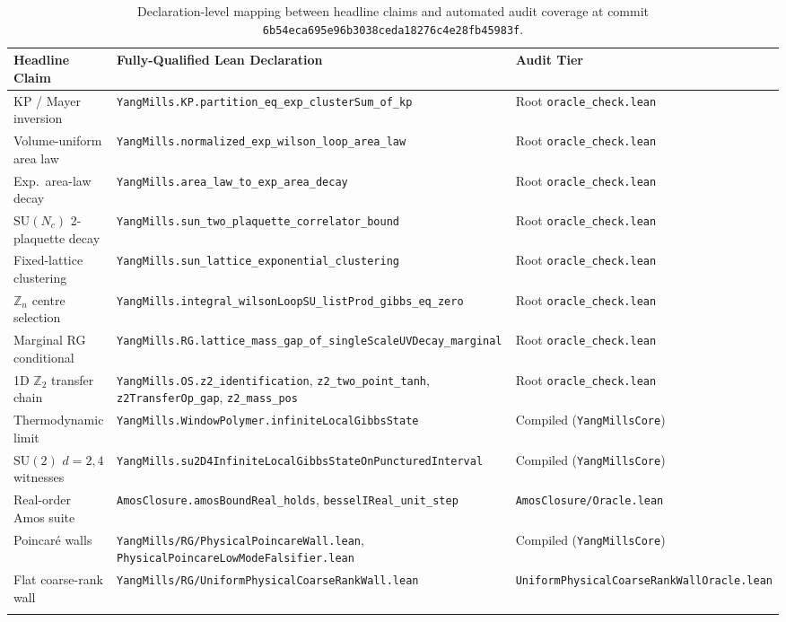 \documentclass[11pt]{article}
\newcommand{\Z}{\mathbb{Z}}
\begin{document}
{\footnotesize
\begin{longtable}{@{}>{\raggedright\arraybackslash}p{}>{\raggedright\arraybackslash}p{}>{\raggedright\arraybackslash}p{}@{}}
\toprule
\textbf{Headline Claim} & \textbf{Fully-Qualified Lean Declaration} & \textbf{Audit Tier} \\
\midrule
\endhead
KP / Mayer inversion & \nolinkurl{YangMills.KP.partition_eq_exp_clusterSum_of_kp} & Root \texttt{oracle\_check.lean} \\
Volume-uniform area law & \nolinkurl{YangMills.normalized_exp_wilson_loop_area_law} & Root \texttt{oracle\_check.lean} \\
Exp.\ area-law decay & \nolinkurl{YangMills.area_law_to_exp_area_decay} & Root \texttt{oracle\_check.lean} \\
$\mathrm{SU}(N_c)$ 2-plaquette decay & \nolinkurl{YangMills.sun_two_plaquette_correlator_bound} & Root \texttt{oracle\_check.lean} \\
Fixed-lattice clustering & \nolinkurl{YangMills.sun_lattice_exponential_clustering} & Root \texttt{oracle\_check.lean} \\
$\Z_n$ centre selection & \nolinkurl{YangMills.integral_wilsonLoopSU_listProd_gibbs_eq_zero} & Root \texttt{oracle\_check.lean} \\
Marginal RG conditional & \nolinkurl{YangMills.RG.lattice_mass_gap_of_singleScaleUVDecay_marginal} & Root \texttt{oracle\_check.lean} \\
1D $\Z_2$ transfer chain & \nolinkurl{YangMills.OS.z2_identification}, \nolinkurl{z2_two_point_tanh}, \nolinkurl{z2TransferOp_gap}, \nolinkurl{z2_mass_pos} & Root \texttt{oracle\_check.lean} \\
Thermodynamic limit & \nolinkurl{YangMills.WindowPolymer.infiniteLocalGibbsState} & Compiled (\texttt{YangMillsCore}) \\
$\mathrm{SU}(2)$ $d=2,4$ witnesses & \nolinkurl{YangMills.su2D4InfiniteLocalGibbsStateOnPuncturedInterval} & Compiled (\texttt{YangMillsCore}) \\
Real-order Amos suite & \nolinkurl{AmosClosure.amosBoundReal_holds}, \nolinkurl{besselIReal_unit_step} & \texttt{AmosClosure/Oracle.lean} \\
Poincar\'e walls & \nolinkurl{YangMills/RG/PhysicalPoincareWall.lean}, \nolinkurl{PhysicalPoincareLowModeFalsifier.lean} & Compiled (\texttt{YangMillsCore}) \\
Flat coarse-rank wall & \nolinkurl{YangMills/RG/UniformPhysicalCoarseRankWall.lean} & \nolinkurl{UniformPhysicalCoarseRankWallOracle.lean} \\
\bottomrule
\caption{Declaration-level mapping between headline claims and automated audit coverage at
commit \texttt{6b54eca695e96b3038ceda18276c4e28fb45983f}.}
\label{tab:audit}
\end{longtable}
}
\end{document}
